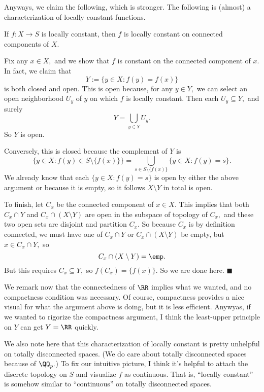 Anyways, we claim the following, which is stronger. The following is (almost) a characterization of locally constant functions.
\begin{proposition}
    If $f:X\to S$ is locally constant, then $f$ is locally constant on connected components of $X.$
\end{proposition}
Fix any $x\in X,$ and we show that $f$ is constant on the connected component of $x.$ In fact, we claim that
\[Y:=\{y\in X:f(y)=f(x)\}\]
is both closed and open. This is open because, for any $y\in Y,$ we can select an open neighborhood $U_y$ of $y$ on which $f$ is locally constant. Then each $U_y\subseteq Y,$ and surely
\[Y=\bigcup_{y\in Y}U_y.\]
So $Y$ is open.

Conversely, this is closed because the complement of $Y$ is
\[\{y\in X:f(y)\in S\setminus\{f(x)\}\}=\bigcup_{s\in S\setminus\{f(x)\}}\{y\in X:f(y)=s\}.\]
We already know that each $\{y\in X:f(y)=s\}$ is open by either the above argument or because it is empty, so it follows $X\setminus Y$ in total is open.

To finish, let $C_x$ be the connected component of $x\in X.$ This implies that both $C_x\cap Y$ and $C_x\cap(X\setminus Y)$ are open in the subspace of topology of $C_x,$ and these two open sets are disjoint and partition $C_x.$ So because $C_x$ is by definition connected, we must have one of $C_x\cap Y$ or $C_x\cap(X\setminus Y)$ be empty, but $x\in C_x\cap Y,$ so
\[C_x\cap(X\setminus Y)=\emp.\]
But this requires $C_x\subseteq Y,$ so $f(C_x)=\{f(x)\}.$ So we are done here. $\blacksquare$

We remark now that the connectedness of $\RR$ implies what we wanted, and no compactness condition was necessary. Of course, compactness provides a nice visual for what the argument above is doing, but it is less efficient. Anywyas, if we wanted to rigorize the compactness argument, I think the least-upper principle on $Y$ can get $Y=\RR$ quickly.

We also note here that this characterization of locally constant is pretty unhelpful on totally disconnected spaces. (We do care about totally disconnected spaces because of $\QQ_p.$) To fix our intuitive picture, I think it's helpful to attach the discrete topology on $S$ and visualize $f$ as continuous. That is, ``locally constant'' is somehow similar to ``continuous'' on totally disconnected spaces.

